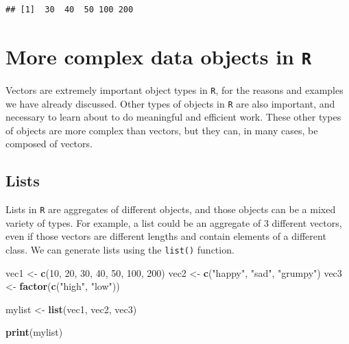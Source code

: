 \documentclass[]{book}
\newenvironment{Shaded}{\begin{snugshade}}{\end{snugshade}}
\newcommand{\DecValTok}[1]{\textcolor[rgb]{0.00,0.00,0.81}{#1}}
\newcommand{\KeywordTok}[1]{\textcolor[rgb]{0.13,0.29,0.53}{\textbf{#1}}}
\newcommand{\NormalTok}[1]{#1}
\newcommand{\StringTok}[1]{\textcolor[rgb]{0.31,0.60,0.02}{#1}}
\begin{document}
\begin{verbatim}
## [1]  30  40  50 100 200
\end{verbatim}

\hypertarget{more-complex-data-objects-in-r}{%
\section{\texorpdfstring{More complex data objects in \texttt{R}}{More complex data objects in R}}\label{more-complex-data-objects-in-r}}

Vectors are extremely important object types in \texttt{R}, for the reasons and examples we have already discussed. Other types of objects in \texttt{R} are also important, and necessary to learn about to do meaningful and efficient work. These other types of objects are more complex than vectors, but they can, in many cases, be composed of vectors.

\hypertarget{lists}{%
\subsection{Lists}\label{lists}}

Lists in \texttt{R} are aggregates of different objects, and those objects can be a mixed variety of types. For example, a list could be an aggregate of 3 different vectors, even if those vectors are different lengths and contain elements of a different class. We can generate lists using the \texttt{list()} function.

\begin{Shaded}
\begin{Highlighting}[]
\NormalTok{vec1 <-}\StringTok{ }\KeywordTok{c}\NormalTok{(}\DecValTok{10}\NormalTok{, }\DecValTok{20}\NormalTok{, }\DecValTok{30}\NormalTok{, }\DecValTok{40}\NormalTok{, }\DecValTok{50}\NormalTok{, }\DecValTok{100}\NormalTok{, }\DecValTok{200}\NormalTok{)}
\NormalTok{vec2 <-}\StringTok{ }\KeywordTok{c}\NormalTok{(}\StringTok{"happy"}\NormalTok{, }\StringTok{"sad"}\NormalTok{, }\StringTok{"grumpy"}\NormalTok{)}
\NormalTok{vec3 <-}\StringTok{ }\KeywordTok{factor}\NormalTok{(}\KeywordTok{c}\NormalTok{(}\StringTok{"high"}\NormalTok{, }\StringTok{"low"}\NormalTok{))}

\NormalTok{mylist <-}\StringTok{ }\KeywordTok{list}\NormalTok{(vec1, vec2, vec3)}

\KeywordTok{print}\NormalTok{(mylist)}
\end{Highlighting}
\end{Shaded}
\end{document}

